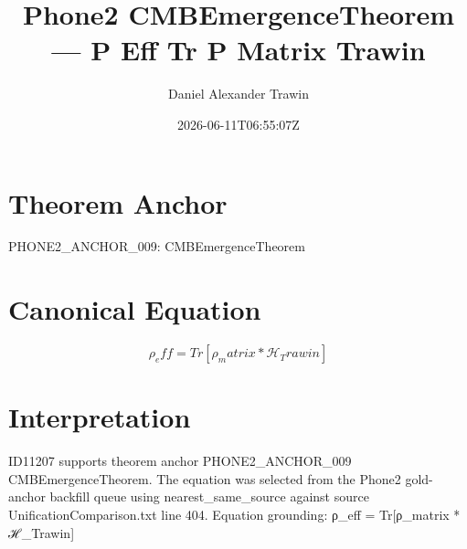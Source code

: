 \documentclass[11pt]{article}
\title{Phone2 CMBEmergenceTheorem — Ρ Eff Tr Ρ Matrix Trawin}
\author{Daniel Alexander Trawin}
\date{2026-06-11T06:55:07Z}
\begin{document}
\maketitle
\section*{Theorem Anchor}
PHONE2_ANCHOR_009: CMBEmergenceTheorem
\section*{Canonical Equation}
\[
ρ_eff = Tr[ρ_matrix * ℋ_Trawin]
\]
\section*{Interpretation}
ID11207 supports theorem anchor PHONE2_ANCHOR_009 CMBEmergenceTheorem. The equation was selected from the Phone2 gold-anchor backfill queue using nearest_same_source against source UnificationComparison.txt line 404. Equation grounding: ρ_eff = Tr[ρ_matrix * ℋ_Trawin]
\end{document}
